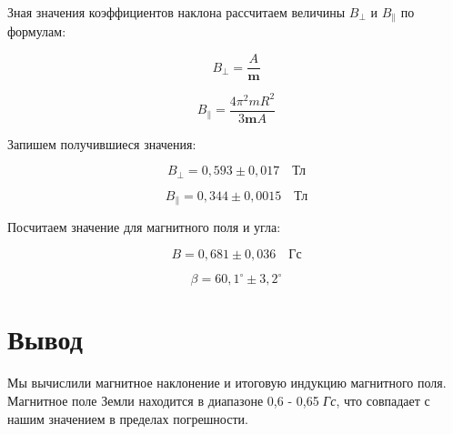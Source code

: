 \documentclass[a4paper,12pt]{article}
\begin{document}
\begin{enumerate}
Зная значения коэффициентов наклона рассчитаем величины $B_{\bot}$ и $B_{\|}$ по формулам:

\[B_{\bot} = \frac{A}{\textbf{m}}\]

\[B_{\|} = \frac{4\pi^2 m R^2}{3\textbf{m} A}\]

Запишем получившиеся значения:

\[B_{\bot} = 0,593 \pm 0,017 \quad \textit{Тл}\]

\[B_{\|} = 0,344 \pm 0,0015 \quad \textit{Тл}\]

Посчитаем значение для магнитного поля и угла:

\[B = 0,681 \pm 0,036 \quad \textit{Гс}\]

\[\beta = 60,1^{\circ} \pm 3,2^{\circ} \]

\section*{Вывод}

Мы вычислили магнитное наклонение и итоговую индукцию магнитного поля. Магнитное поле Земли находится в диапазоне 0,6 - 0,65 \textit{Гс}, что совпадает с нашим значением в пределах погрешности. \\

\end{enumerate}
\end{document}
